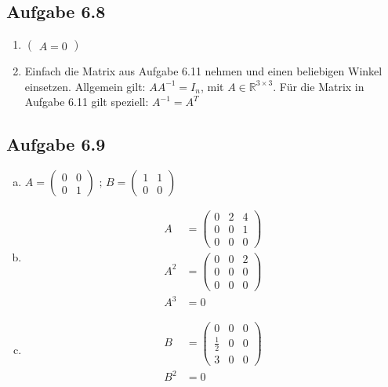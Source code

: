 \documentclass{standalone}
\begin{document}
\subsection{Aufgabe 6.8}
\begin{enumerate}
    \item $\begin{pmatrix}
        A = 0
    \end{pmatrix}$
    \item Einfach die Matrix aus Aufgabe 6.11 nehmen und einen beliebigen Winkel einsetzen. Allgemein gilt: $AA^{-1} = I_n$, mit $A \in \mathbb{R}^{3 \times 3}$. Für die Matrix in Aufgabe 6.11 gilt speziell: $A^{-1}=A^T$
\end{enumerate}
    
\subsection{Aufgabe 6.9}
\begin{enumerate}[a)]
    \item $A = \begin{pmatrix}
        0 & 0 \\
        0 & 1
    \end{pmatrix}\text{ ; }
    B = \begin{pmatrix}
        1 & 1 \\
        0 & 0
    \end{pmatrix}
    $
    \item \begin{align}
        A &= \begin{pmatrix}
            0 & 2 & 4 \\
            0 & 0 & 1 \\
            0 & 0 & 0
        \end{pmatrix}\\
        A^2 &= \begin{pmatrix}
            0 & 0 & 2 \\
            0 & 0 & 0 \\
            0 & 0 & 0
        \end{pmatrix} \\
        A^3 &= 0
    \end{align}
    \item \begin{align}
        B &= \begin{pmatrix}
            0 & 0 & 0 \\
            \frac{1}{2} & 0 & 0 \\
            3 & 0 & 0
        \end{pmatrix}\\
        B^2 &= 0
    \end{align}
\end{enumerate}
\end{document}
